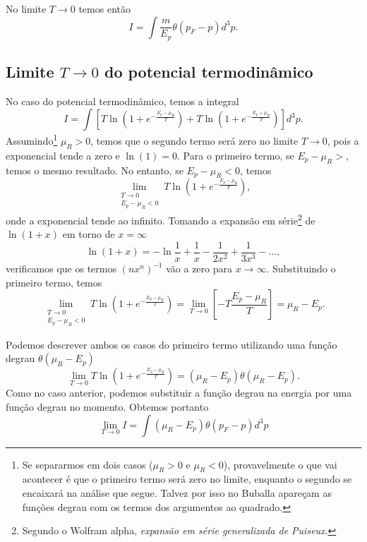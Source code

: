 No limite $T \to 0$ temos então
\begin{equation}
	I = \int \frac{m}{E_p} \theta(p_F - p) d^3p.
\end{equation}

\subsection{Limite $T \to 0$ do potencial termodinâmico}

No caso do potencial termodinâmico, temos a integral
\begin{equation}
	I = \int [T \ln(1+e^{-\frac{E_p - \mu_R}{T}}) + T\ln(1+e^{-\frac{E_p + \mu_R}{T}})] d^3p.
\end{equation}
%
Assumindo\footnote{Se separarmos em dois casos ($\mu_R > 0$ e $\mu_R < 0$), provavelmente o que vai acontecer é que o primeiro termo será zero no limite, enquanto o segundo se encaixará na análise que segue. Talvez por isso no Buballa apareçam as funções degrau com os termos dos argumentos ao quadrado.} $\mu_R > 0$, temos que o segundo termo será zero no limite $T \to 0$, pois a exponencial tende a zero e $\ln(1) = 0$. Para o primeiro termo, se $E_p - \mu_R >$, temos o mesmo resultado. No entanto, se $E_p - \mu_R < 0$, temos
\begin{equation}
	\lim_{\substack{T \to 0 \\ E_p - \mu_R < 0}} T \ln(1+e^{-\frac{E_p - \mu_R}{T}}),
\end{equation}
%
onde a exponencial tende ao infinito. Tomando a expansão em série\footnote{Segundo o Wolfram alpha, \emph{expansão em série generalizada de Puiseux}.} de $\ln(1 + x)$ em torno de $x = \infty$
\begin{equation}
	\ln(1 + x) = -\ln\frac{1}{x} + \frac{1}{x} - \frac{1}{2x^2} + \frac{1}{3x^3} - \dots,
\end{equation}
%
verificamos que os termos $(n x^n)^{-1}$ vão a zero para $x \to \infty$. Substituindo o primeiro termo, temos
\begin{equation}
	\lim_{\substack{T \to 0 \\ E_p - \mu_R < 0}} T \ln(1+e^{-\frac{E_p - \mu_R}{T}}) = \lim_{T \to 0} \left[-T \frac{E_p - \mu_R}{T} \right] = \mu_R - E_p.
\end{equation}
%

Podemos descrever ambos os casos do primeiro termo utilizando uma função degrau $\theta(\mu_R - E_p)$
\begin{equation}
	\lim_{T \to 0} T \ln(1+e^{-\frac{E_p - \mu_R}{T}}) = (\mu_R - E_p)\theta(\mu_R - E_p).
\end{equation}
%
Como no caso anterior, podemos substituir a função degrau na energia por uma função degrau no momento. Obtemos portanto
\begin{equation}
	\lim_{T \to 0} I = \int (\mu_R - E_p)\theta(p_F - p) d^3p
\end{equation}
%

